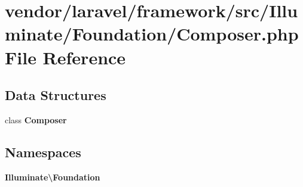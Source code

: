 \section{vendor/laravel/framework/src/\+Illuminate/\+Foundation/\+Composer.php File Reference}
\label{_composer_8php}
\subsection*{Data Structures}
\begin{DoxyCompactItemize}
\item 
class {\bf Composer}
\end{DoxyCompactItemize}
\subsection*{Namespaces}
\begin{DoxyCompactItemize}
\item 
 {\bf Illuminate\textbackslash{}\+Foundation}
\end{DoxyCompactItemize}
